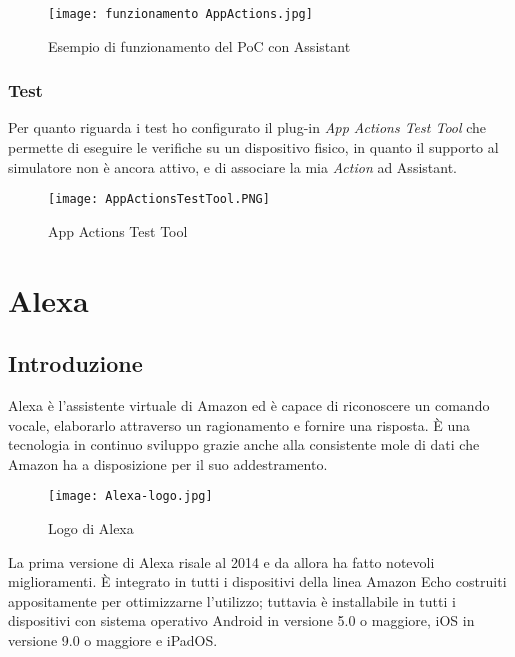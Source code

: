 		\begin{figure}[htbp]
			\begin{center}
				\texttt{[image: funzionamento AppActions.jpg]}
				\caption{Esempio di funzionamento del PoC con Assistant}
			\end{center}
		\end{figure}

		\subsubsection{Test}
		Per quanto riguarda i test ho configurato il plug-in \emph{App Actions Test Tool} che permette di eseguire le verifiche su un dispositivo fisico, in quanto il supporto al simulatore non è ancora attivo, e di associare la mia \emph{Action} ad Assistant.
		
		\begin{figure}[htbp]
			\begin{center}
				\texttt{[image: AppActionsTestTool.PNG]}
				\caption{App Actions Test Tool}
			\end{center}
		\end{figure}
	\pagebreak
		
\section{Alexa}
	\subsection{Introduzione}
	Alexa è l'assistente virtuale di Amazon ed è capace di riconoscere un comando vocale, elaborarlo attraverso un ragionamento e fornire una risposta. È una tecnologia in continuo sviluppo grazie anche alla consistente mole di dati che Amazon ha a disposizione per il suo addestramento.
	
	\begin{figure}[htbp]
		\begin{center}
			\texttt{[image: Alexa-logo.jpg]}
			\caption{Logo di Alexa}
		\end{center}
	\end{figure}
	
	La prima versione di Alexa risale al 2014 e da allora ha fatto notevoli miglioramenti. È integrato in tutti i dispositivi della linea Amazon Echo costruiti appositamente per ottimizzarne l'utilizzo; tuttavia è installabile in tutti i dispositivi con sistema operativo Android in versione 5.0 o maggiore, iOS in versione 9.0 o maggiore e iPadOS.
